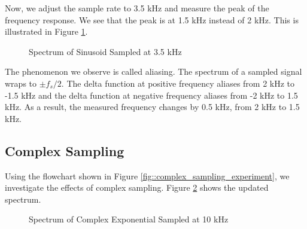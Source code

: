 \documentclass{article}
\begin{document}
Now, we adjust the sample rate to 3.5 kHz and measure the peak of the frequency response. We see that the peak is at 1.5 kHz instead of 2 kHz. This is illustrated in Figure \ref{fig::sampling_rates_freq_domain_3_5k_samp_rate}.

\begin{figure}[H]
	\centerline{}
	\caption{Spectrum of Sinusoid Sampled at 3.5 kHz}
	\label{fig::sampling_rates_freq_domain_3_5k_samp_rate}
\end{figure}

The phenomenon we observe is called aliasing. The spectrum of a sampled signal wraps to $\pm f_s/2$. The delta function at positive frequency aliases from 2 kHz to -1.5 kHz and the delta function at negative frequency aliases from -2 kHz to 1.5 kHz. As a result, the measured frequency changes by 0.5 kHz, from 2 kHz to 1.5 kHz.

\subsection{Complex Sampling}

Using the flowchart shown in Figure \ref{fig::complex_sampling_experiment}, we investigate the effects of complex sampling. Figure \ref{fig::complex_sampling_freq_domain_10k_samp_rate} shows the updated spectrum.

\begin{figure}[H]
	\centerline{}
	\caption{Spectrum of Complex Exponential Sampled at 10 kHz}
	\label{fig::complex_sampling_freq_domain_10k_samp_rate}
\end{figure}
\end{document}
